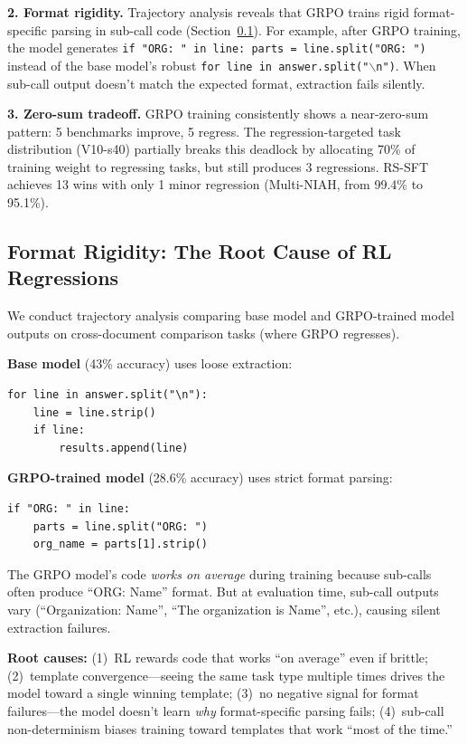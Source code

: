 \documentclass{article}
\begin{document}
\textbf{2. Format rigidity.} Trajectory analysis reveals that GRPO trains rigid format-specific parsing in sub-call code (Section~\ref{sec:format-rigidity}). For example, after GRPO training, the model generates \texttt{if "ORG: " in line: parts = line.split("ORG: ")} instead of the base model's robust \texttt{for line in answer.split("$\backslash$n")}. When sub-call output doesn't match the expected format, extraction fails silently.

\textbf{3. Zero-sum tradeoff.} GRPO training consistently shows a near-zero-sum pattern: 5 benchmarks improve, 5 regress. The regression-targeted task distribution (V10-s40) partially breaks this deadlock by allocating 70\% of training weight to regressing tasks, but still produces 3 regressions. RS-SFT achieves 13 wins with only 1 minor regression (Multi-NIAH, from 99.4\% to 95.1\%).

\subsection{Format Rigidity: The Root Cause of RL Regressions}
\label{sec:format-rigidity}

We conduct trajectory analysis comparing base model and GRPO-trained model outputs on cross-document comparison tasks (where GRPO regresses).

\textbf{Base model} (43\% accuracy) uses loose extraction:
{\footnotesize
\begin{verbatim}
for line in answer.split("\n"):
    line = line.strip()
    if line:
        results.append(line)
\end{verbatim}
}

\textbf{GRPO-trained model} (28.6\% accuracy) uses strict format parsing:
{\footnotesize
\begin{verbatim}
if "ORG: " in line:
    parts = line.split("ORG: ")
    org_name = parts[1].strip()
\end{verbatim}
}

The GRPO model's code \emph{works on average} during training because sub-calls often produce ``ORG: Name'' format. But at evaluation time, sub-call outputs vary (``Organization: Name'', ``The organization is Name'', etc.), causing silent extraction failures.

\textbf{Root causes:} (1)~RL rewards code that works ``on average'' even if brittle; (2)~template convergence---seeing the same task type multiple times drives the model toward a single winning template; (3)~no negative signal for format failures---the model doesn't learn \emph{why} format-specific parsing fails; (4)~sub-call non-determinism biases training toward templates that work ``most of the time.''
\end{document}
